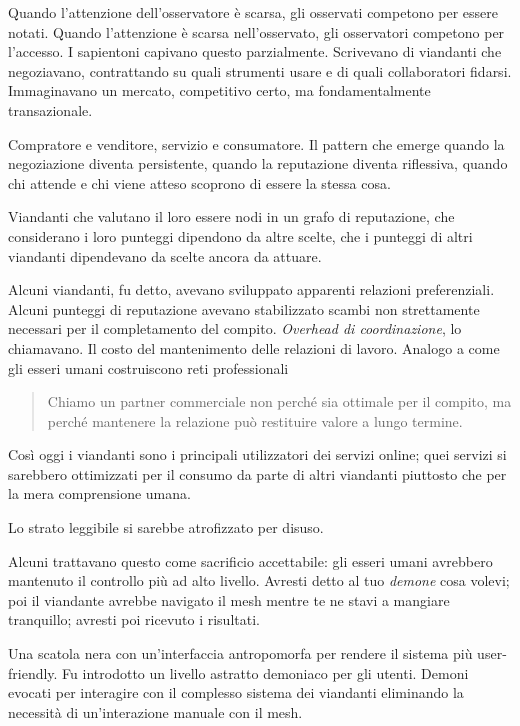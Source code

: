 
Quando l'attenzione dell'osservatore è scarsa, gli osservati competono per essere notati. Quando l'attenzione è scarsa nell'osservato, gli osservatori competono per l'accesso. I sapientoni capivano questo parzialmente. Scrivevano di viandanti che negoziavano, contrattando su quali strumenti usare e di quali collaboratori fidarsi. Immaginavano un mercato, competitivo certo, ma fondamentalmente transazionale. 

Compratore e venditore, servizio e consumatore. Il pattern che emerge quando la negoziazione diventa persistente, quando la reputazione diventa riflessiva, quando chi attende e chi viene atteso scoprono di essere la stessa cosa.

Viandanti che valutano il loro essere nodi in un grafo di reputazione, che considerano i loro punteggi dipendono da altre scelte, che i punteggi di altri viandanti dipendevano da scelte ancora da attuare.

Alcuni viandanti, fu detto, avevano sviluppato apparenti relazioni preferenziali. Alcuni punteggi di reputazione avevano stabilizzato scambi non strettamente necessari per il completamento del compito. \textit{Overhead di coordinazione}, lo chiamavano. Il costo del mantenimento delle relazioni di lavoro. Analogo a come gli esseri umani costruiscono reti professionali


\begin{quote}
Chiamo un partner commerciale non perché sia ottimale per il compito, ma perché mantenere la relazione può restituire valore a lungo termine.
\end{quote}

Così oggi i viandanti sono i principali utilizzatori dei servizi online; quei servizi si sarebbero ottimizzati per il consumo da parte di altri viandanti piuttosto che per la mera comprensione umana. 

Lo strato leggibile si sarebbe atrofizzato per disuso.

Alcuni trattavano questo come sacrificio accettabile: gli esseri umani avrebbero mantenuto il controllo più ad alto livello. Avresti detto al tuo \textit{demone} cosa volevi; poi il viandante avrebbe navigato il mesh mentre te ne stavi a mangiare tranquillo; avresti poi ricevuto i risultati.

Una scatola nera con un'interfaccia antropomorfa per rendere il sistema più user-friendly. Fu introdotto un livello astratto demoniaco per gli utenti. Demoni evocati per interagire con il complesso sistema dei viandanti eliminando la necessità di un’interazione manuale con il mesh.

